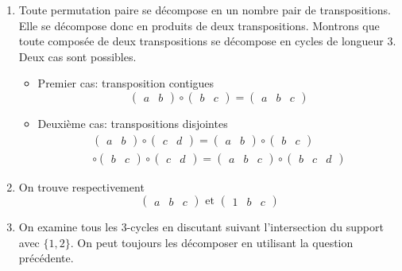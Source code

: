 \begin{enumerate}
 \item Toute permutation paire se décompose en un nombre pair de transpositions. Elle se décompose donc en produits de deux transpositions. Montrons que toute composée de deux transpositions se décompose en cycles de longueur $3$. Deux cas sont possibles.
\begin{itemize}
 \item Premier cas: transposition contigues
\begin{displaymath}
 \begin{pmatrix}
  a&b
 \end{pmatrix}
\circ
 \begin{pmatrix}
  b&c
 \end{pmatrix}
=
 \begin{pmatrix}
  a&b&c
 \end{pmatrix}
\end{displaymath}
\item Deuxième cas: transpositions disjointes
\begin{multline*}
 \begin{pmatrix}
  a&b
 \end{pmatrix}
\circ
 \begin{pmatrix}
  c&d
 \end{pmatrix}
=
 \begin{pmatrix}
  a&b
 \end{pmatrix}
\circ
 \begin{pmatrix}
  b&c
 \end{pmatrix} \\
\circ
 \begin{pmatrix}
  b&c
 \end{pmatrix}
\circ
 \begin{pmatrix}
  c&d
 \end{pmatrix}
=
 \begin{pmatrix}
  a&b&c
 \end{pmatrix} 
\circ
 \begin{pmatrix}
  b&c&d
  \end{pmatrix}
\end{multline*}
\end{itemize}
\item On trouve respectivement
\begin{displaymath}
 \begin{pmatrix}
  a&b&c
 \end{pmatrix} 
\text{ et }
 \begin{pmatrix}
  1&b&c
 \end{pmatrix} 
\end{displaymath}

\item On examine tous les 3-cycles en discutant suivant l'intersection du support avec $\{1,2\}$. On peut toujours les décomposer en utilisant la question précédente.

\end{enumerate}

